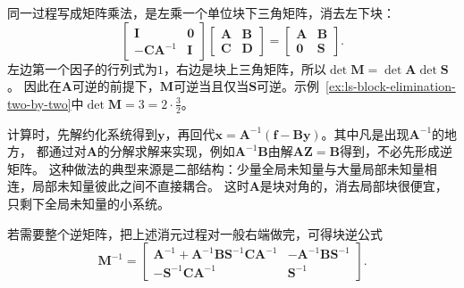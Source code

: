 同一过程写成矩阵乘法，是左乘一个单位块下三角矩阵，消去左下块：
\[
 \begin{bmatrix}\bm I&\bm0\\-\bm C\bm A^{-1}&\bm I\end{bmatrix}
 \begin{bmatrix}\bm A&\bm B\\\bm C&\bm D\end{bmatrix}
 =\begin{bmatrix}\bm A&\bm B\\\bm0&\bm S\end{bmatrix}.
\]
左边第一个因子的行列式为$1$，右边是块上三角矩阵，所以$\det\bm M=\det\bm A\det\bm S$。
因此在$\bm A$可逆的前提下，$\bm M$可逆当且仅当$\bm S$可逆。示例~\ref{ex:ls-block-elimination-two-by-two}中$\det\bm M=3=2\cdot\tfrac32$。

计算时，先解约化系统得到$\bm y$，再回代$\bm x=\bm A^{-1}(\bm f-\bm B\bm y)$。其中凡是出现$\bm A^{-1}$的地方，
都通过对$\bm A$的分解求解来实现，例如$\bm A^{-1}\bm B$由解$\bm A\bm Z=\bm B$得到，不必先形成逆矩阵。
这种做法的典型来源是二部结构：少量全局未知量与大量局部未知量相连，局部未知量彼此之间不直接耦合。
这时$\bm A$是块对角的，消去局部块很便宜，只剩下全局未知量的小系统。

若需要整个逆矩阵，把上述消元过程对一般右端做完，可得块逆公式
\begin{equation}
 \bm M^{-1}=
 \begin{bmatrix}
  \bm A^{-1}+\bm A^{-1}\bm B\bm S^{-1}\bm C\bm A^{-1}
  &-\bm A^{-1}\bm B\bm S^{-1}\\
  -\bm S^{-1}\bm C\bm A^{-1}&\bm S^{-1}
 \end{bmatrix}.
 \label{eq:matrix-analysis-block-inverse}
\end{equation}

